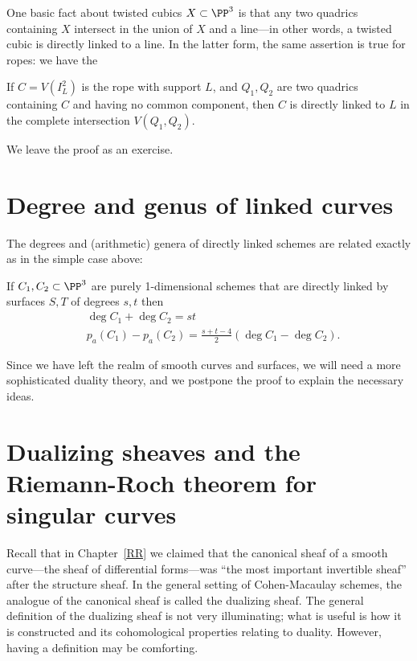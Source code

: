 One basic fact about twisted cubics $X \subset \PP^3$ is that any two quadrics containing $X$ intersect in the union of $X$ and a line---in other words, a twisted cubic is directly linked to a line. In the latter form, the same assertion is true for ropes: we have the

\begin{proposition}
If $C = V(I_L^2)$ is the rope with support $L$, and $Q_1, Q_2$ are two quadrics containing $C$ and having no common component, then $C$ is directly linked to $L$ in the complete intersection $V(Q_1,Q_2)$.
\end{proposition}

We leave the proof as an exercise.

\section{Degree and genus of linked curves}

The degrees and (arithmetic) genera 
of directly linked schemes are related exactly as in the simple case above:

\begin{theorem}\label{direct linkage}\label{linked genus formula}
If $C_1,{C_2}\subset \PP^3$ are purely 1-dimensional schemes that are directly linked by surfaces $S,T$ of degrees $s,t$  then 
$$
\begin{aligned}
&\deg C_1+\deg C_2 = st\\
&p_a(C_1) - p_a({C_2}) = \frac{s+t-4}{2}(\deg C_1-\deg {C_2}).
\end{aligned}
 $$
\end{theorem}

Since we have left the realm of smooth curves and surfaces, we will need a more sophisticated duality theory, and we
postpone the proof to explain the necessary ideas.

\section{Dualizing sheaves and the Riemann-Roch theorem for singular curves }\label{duality}

Recall that in Chapter~\ref{RR} we claimed that the canonical sheaf of a smooth curve---the sheaf of differential forms---was ``the most important invertible sheaf'' after the structure sheaf. In the general setting of Cohen-Macaulay schemes, the analogue of the canonical sheaf is called the dualizing sheaf.
The general definition of the dualizing sheaf is not very illuminating; what is useful is how it is constructed and its cohomological properties relating to duality.
However, having a definition may be comforting. 

